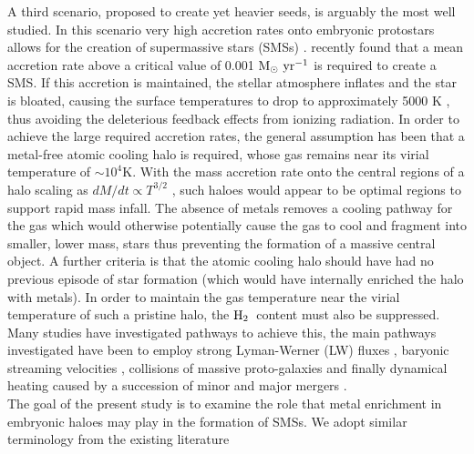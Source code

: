 \documentclass[twocolumn,iop,revtex4]{openjournal}
\newcommand{\msolaryr} {$\rm{M_{\odot}~yr^{-1}}~$}
\newcommand{\molH} {$\rm{H_2}$~}
\begin{document}
\indent A third scenario, proposed to create yet heavier seeds, is arguably the most well studied.
In this scenario very high accretion rates onto embryonic protostars allows for the creation of supermassive stars (SMSs)
\citep{Shapiro_1979, Begelman_2008, Schleicher_2013, Hosokawa_2013, Inayoshi_2014, Sakurai_2016,
  Umeda_2016, Haemmerle_2018,Woods_2017, Woods_2018, Regan_2018b}. \cite{Haemmerle_2018} recently found
that a mean accretion rate above a critical value of 0.001 \msolaryr is required to create a SMS.
If this accretion is maintained, the stellar atmosphere inflates and the star is bloated,
causing the surface temperatures to drop to approximately 5000 K \citep{Hosokawa_2013, Woods_2017, Haemmerle_2018},
thus avoiding the deleterious feedback effects from ionizing radiation.
In order to achieve the large required accretion rates, the general assumption has been
that a metal-free atomic cooling halo is required, whose gas remains near its virial temperature of $\sim10^4$K.
With the mass accretion rate onto the central regions of a halo scaling as $dM/dt \propto T^{3/2}$ \citep{Shu_1977}, such haloes would appear
to be optimal regions to support rapid mass infall. The absence of metals removes a cooling pathway for
the gas which would otherwise potentially cause the gas to cool and fragment into smaller, lower
mass, stars thus preventing the formation of a massive central object. A further criteria is that the
atomic cooling halo should have had no previous episode of star formation (which would have
internally enriched the halo with metals). In order to maintain the gas temperature near the virial temperature of such a pristine halo, the \molH content
must also be suppressed. Many studies have investigated pathways to achieve this, the main pathways
investigated have been to employ strong Lyman-Werner (LW) fluxes \citep{Dijkstra_2008, Shang_2010,
  Regan_2014b, Latif_2014b, Agarwal_2015a, Latif_2015, Regan_2016a, Regan_2017, Regan_2018a},
baryonic streaming velocities
\citep{Tseliakhovich_2010, Tanaka_2014, Hirano_2017, Schauer_2017}, collisions of massive
proto-galaxies \citep{Mayer_2010, Mayer_2014, Inayoshi_2015} and finally dynamical heating caused
by a succession of minor and major mergers \citep{Yoshida_2003a, Fernandez_2014, Wise_2019}. \\
\indent The goal of the present study is to examine the role that metal enrichment in embryonic haloes may play in the
formation of SMSs. We adopt similar terminology from the existing literature
\end{document}
